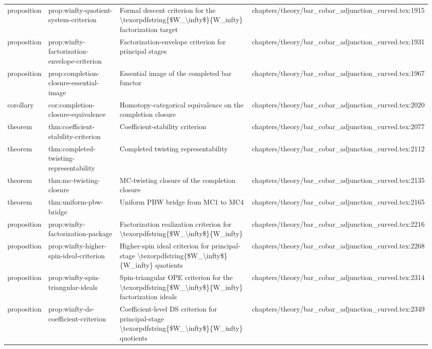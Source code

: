 \documentclass[11pt]{article}
\begin{document}
\begin{longtable}{L{0.10\textwidth}L{0.26\textwidth}L{0.42\textwidth}L{0.22\textwidth}}
proposition & prop:winfty-quotient-system-criterion & Formal descent criterion for the \textbackslash{}texorpdfstring\{\$W\_\textbackslash{}infty\$\}\{W\_infty\} factorization target & chapters/theory/bar\_cobar\_adjunction\_curved.tex:1915\\
proposition & prop:winfty-factorization-envelope-criterion & Factorization-envelope criterion for principal stages & chapters/theory/bar\_cobar\_adjunction\_curved.tex:1931\\
proposition & prop:completion-closure-essential-image & Essential image of the completed bar functor & chapters/theory/bar\_cobar\_adjunction\_curved.tex:1967\\
corollary & cor:completion-closure-equivalence & Homotopy-categorical equivalence on the completion closure & chapters/theory/bar\_cobar\_adjunction\_curved.tex:2020\\
theorem & thm:coefficient-stability-criterion & Coefficient-stability criterion & chapters/theory/bar\_cobar\_adjunction\_curved.tex:2077\\
theorem & thm:completed-twisting-representability & Completed twisting representability & chapters/theory/bar\_cobar\_adjunction\_curved.tex:2112\\
theorem & thm:mc-twisting-closure & MC-twisting closure of the completion closure & chapters/theory/bar\_cobar\_adjunction\_curved.tex:2135\\
theorem & thm:uniform-pbw-bridge & Uniform PBW bridge from MC1 to MC4 & chapters/theory/bar\_cobar\_adjunction\_curved.tex:2165\\
proposition & prop:winfty-factorization-package & Factorization realization criterion for \textbackslash{}texorpdfstring\{\$W\_\textbackslash{}infty\$\}\{W\_infty\} & chapters/theory/bar\_cobar\_adjunction\_curved.tex:2216\\
proposition & prop:winfty-higher-spin-ideal-criterion & Higher-spin ideal criterion for principal-stage \textbackslash{}texorpdfstring\{\$W\_\textbackslash{}infty\$\}\{W\_infty\} quotients & chapters/theory/bar\_cobar\_adjunction\_curved.tex:2268\\
proposition & prop:winfty-spin-triangular-ideals & Spin-triangular OPE criterion for the \textbackslash{}texorpdfstring\{\$W\_\textbackslash{}infty\$\}\{W\_infty\} factorization ideals & chapters/theory/bar\_cobar\_adjunction\_curved.tex:2314\\
proposition & prop:winfty-ds-coefficient-criterion & Coefficient-level DS criterion for principal-stage \textbackslash{}texorpdfstring\{\$W\_\textbackslash{}infty\$\}\{W\_infty\} quotients & chapters/theory/bar\_cobar\_adjunction\_curved.tex:2349\\

\end{longtable}
\end{document}
